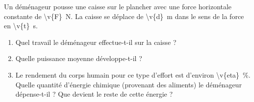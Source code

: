 Un déménageur pousse une caisse sur le plancher avec une force horizontale constante de \qty{\v{F}}{N}. La caisse se déplace de \qty{\v{d}}{m} dans le sens de la force en \qty{\v{t}}{s}.

\begin{enumerate}[label=\alph*)]
    \item Quel travail le déménageur effectue-t-il sur la caisse ?
    \item Quelle puissance moyenne développe-t-il ?
    \item Le rendement du corps humain pour ce type d'effort est d'environ \qty{\v{eta}}{\percent}. Quelle quantité d'énergie chimique (provenant des aliments) le déménageur dépense-t-il ? Que devient le reste de cette énergie ?
\end{enumerate}

